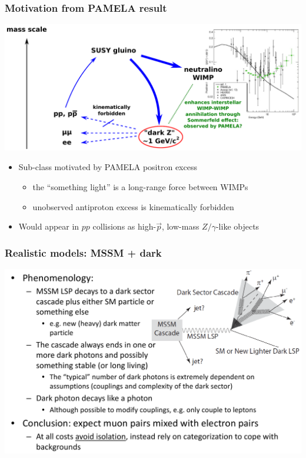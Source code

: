 \documentclass[compress]{beamer}
\begin{document}
\begin{frame}
\frametitle{Motivation from PAMELA result}
\includegraphics[width=\linewidth]{basic_picture2.pdf}

\vspace{0.5 cm}
\begin{itemize}
\item Sub-class motivated by PAMELA positron excess
\begin{itemize}
\item the ``something light'' is a long-range force between WIMPs
\item unobserved antiproton excess is kinematically forbidden
\end{itemize}
\item Would appear in $pp$ collisions as high-$\vec{p}$, low-mass $Z/\gamma$-like objects
\end{itemize}
\end{frame}

\begin{frame}
\frametitle{Realistic models: MSSM + dark}

\includegraphics[width=\linewidth]{alexeis_slide.png}
\end{frame}
\end{document}

